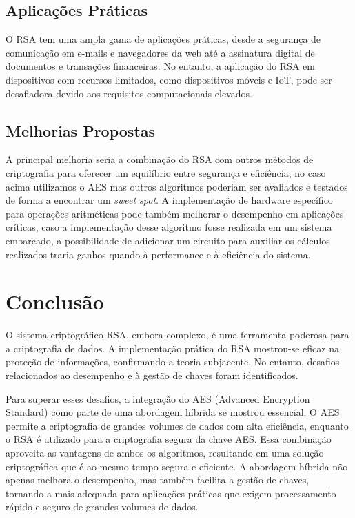 \documentclass[a4paper,12pt]{article}
\begin{document}
\subsection*{Aplicações Práticas}
O RSA tem uma ampla gama de aplicações práticas, desde a segurança de comunicação em e-mails e navegadores da web até a assinatura digital de documentos e transações financeiras. No entanto, a aplicação do RSA em dispositivos com recursos limitados, como dispositivos móveis e IoT, pode ser desafiadora devido aos requisitos computacionais elevados.

\subsection*{Melhorias Propostas}
A principal melhoria seria a combinação do RSA com outros métodos de criptografia para oferecer um equilíbrio entre segurança e eficiência, no caso acima utilizamos o AES mas outros algoritmos poderiam ser avaliados e testados de forma a encontrar um \textit{sweet spot}. A implementação de hardware específico para operações aritméticas pode também melhorar o desempenho em aplicações críticas, caso a implementação desse algoritmo fosse realizada em um sistema embarcado, a possibilidade de adicionar um circuito para auxiliar os cálculos realizados traria ganhos quando à performance e à eficiência do sistema.

\section*{Conclusão}
O sistema criptográfico RSA, embora complexo, é uma ferramenta poderosa para a criptografia de dados. A implementação prática do RSA mostrou-se eficaz na proteção de informações, confirmando a teoria subjacente. No entanto, desafios relacionados ao desempenho e à gestão de chaves foram identificados.

Para superar esses desafios, a integração do AES (Advanced Encryption Standard) como parte de uma abordagem híbrida se mostrou essencial. O AES permite a criptografia de grandes volumes de dados com alta eficiência, enquanto o RSA é utilizado para a criptografia segura da chave AES. Essa combinação aproveita as vantagens de ambos os algoritmos, resultando em uma solução criptográfica que é ao mesmo tempo segura e eficiente. A abordagem híbrida não apenas melhora o desempenho, mas também facilita a gestão de chaves, tornando-a mais adequada para aplicações práticas que exigem processamento rápido e seguro de grandes volumes de dados.
\end{document}
